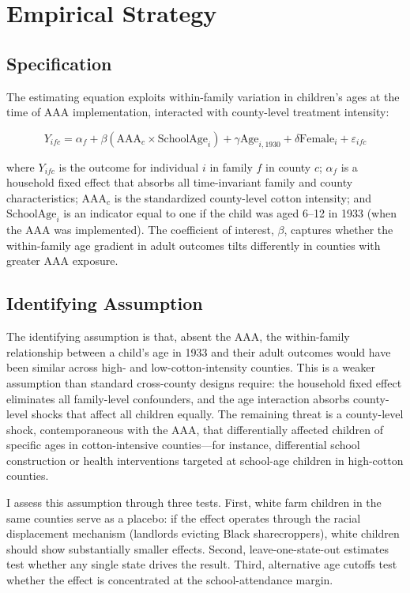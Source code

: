 \documentclass[12pt]{article}
\begin{document}
\section{Empirical Strategy}

\subsection{Specification}

The estimating equation exploits within-family variation in children's ages at the time of AAA implementation, interacted with county-level treatment intensity:

\begin{equation}
Y_{ifc} = \alpha_f + \beta (\text{AAA}_c \times \text{SchoolAge}_i) + \gamma \text{Age}_{i,1930} + \delta \text{Female}_i + \varepsilon_{ifc}
\label{eq:main}
\end{equation}

\noindent where $Y_{ifc}$ is the outcome for individual $i$ in family $f$ in county $c$; $\alpha_f$ is a household fixed effect that absorbs all time-invariant family and county characteristics; $\text{AAA}_c$ is the standardized county-level cotton intensity; and $\text{SchoolAge}_i$ is an indicator equal to one if the child was aged 6--12 in 1933 (when the AAA was implemented). The coefficient of interest, $\beta$, captures whether the within-family age gradient in adult outcomes tilts differently in counties with greater AAA exposure.

\subsection{Identifying Assumption}

The identifying assumption is that, absent the AAA, the within-family relationship between a child's age in 1933 and their adult outcomes would have been similar across high- and low-cotton-intensity counties. This is a weaker assumption than standard cross-county designs require: the household fixed effect eliminates all family-level confounders, and the age interaction absorbs county-level shocks that affect all children equally. The remaining threat is a county-level shock, contemporaneous with the AAA, that differentially affected children of specific ages in cotton-intensive counties---for instance, differential school construction or health interventions targeted at school-age children in high-cotton counties.

I assess this assumption through three tests. First, white farm children in the same counties serve as a placebo: if the effect operates through the racial displacement mechanism (landlords evicting Black sharecroppers), white children should show substantially smaller effects. Second, leave-one-state-out estimates test whether any single state drives the result. Third, alternative age cutoffs test whether the effect is concentrated at the school-attendance margin.
\end{document}

